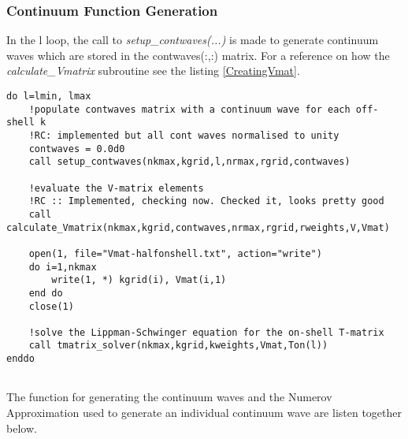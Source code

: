 \documentclass{article}
\begin{document}
    \subsubsection{Continuum Function Generation}
    \label{ContFunctionGeneration}
    
    In the l loop, the call to \textit{setup\_contwaves(...)} is made to generate continuum waves which are stored in the contwaves(:,:) matrix.
    For a reference on how the \textit{calculate\_Vmatrix} subroutine see the listing \ref{CreatingVmat}.
    
    \begin{lstlisting}
do l=lmin, lmax
	!populate contwaves matrix with a continuum wave for each off-shell k
	!RC: implemented but all cont waves normalised to unity
	contwaves = 0.0d0
	call setup_contwaves(nkmax,kgrid,l,nrmax,rgrid,contwaves)
	
	!evaluate the V-matrix elements  
	!RC :: Implemented, checking now. Checked it, looks pretty good
	call calculate_Vmatrix(nkmax,kgrid,contwaves,nrmax,rgrid,rweights,V,Vmat)
	
	open(1, file="Vmat-halfonshell.txt", action="write")
	do i=1,nkmax
		write(1, *) kgrid(i), Vmat(i,1)
	end do
	close(1)
	
	!solve the Lippman-Schwinger equation for the on-shell T-matrix
	call tmatrix_solver(nkmax,kgrid,kweights,Vmat,Ton(l))
enddo
    	
    \end{lstlisting}
    
    The function for generating the continuum waves and the Numerov Approximation used to generate an individual continuum wave are listen together below.
    
\end{document}
